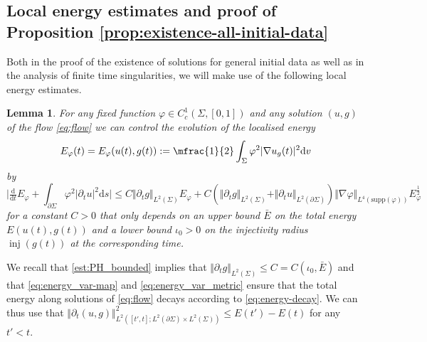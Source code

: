 \documentclass[10pt,reqno]{amsart}
\theoremstyle{plain}
\newtheorem{lemma}{Lemma}[section]
\theoremstyle{definition}
\numberwithin{equation}{section}
\newcommand{\Si}{\Sigma}
\newcommand{\vph}{\varphi}
\newcommand{\vphi}{\varphi}
\newcommand{\grad}{\nabla}
\DeclareMathOperator{\inj}{inj}
\newcommand{\norm}[1]{\Vert#1\Vert}
\newcommand{\beqs}{\begin{equation*}}
\newcommand{\eeqs}{\end{equation*}}
\newcommand{\half}{\frac{1}{2}}
\newcommand{\mhalf}{\mfrac{1}{2}}
\newcommand{\dd}{\mathrm{d}} %
\newcommand{\pt}{\partial_t}
\newcommand{\abs}[1]{\vert#1\vert}
\newcommand{\pSi}{{\partial \Sigma}}
\newcommand{\Ecut}{E_\varphi}
\newcommand{\supp}{\text{supp}}
\newcommand{\p}{\partial} %
\begin{document}
\subsection{Local energy estimates and proof of Proposition \ref{prop:existence-all-initial-data}}\label{subsec:loc-energy}
Both in the proof of the existence of solutions for general initial data as well as in the analysis of finite time singularities, we will make use of the following local energy estimates. 

\begin{lemma}\label{lemma:Ecut}
    For any fixed function $\vph\in C_c^1(\Si,[0,1])$ and any solution $(u,g)$ of the flow \eqref{eq:flow} we can control the evolution of  the localised energy
    \begin{equation*}       
        E_\vph(t)=E_\vphi(u(t),g(t)):=\mhalf\int_{\Si} \vph^2 \abs{\nabla u_g(t)}^2 \dd v
    \end{equation*}
    by 
	\beqs\label{est:loc_E_evol}
		\bigg| \tfrac{\dd}{\dd t} \Ecut+\int_{\pSi}\varphi^2 \abs{\p_t u}^2 \dd s \bigg| \leq C\norm{\pt g}_{L^2(\Si)}\Ecut + C(\norm{\pt g}_{L^2(\Si)}+\norm{\partial_t u}_{L^2(\pSi)}) \norm{\grad \vph}_{L^4(\supp(\vph))} \Ecut^\half
	\eeqs
	for a constant $C>0$ that only depends on an   upper bound $\bar{E}$ on the total energy $E(u(t),g(t))$ and a lower bound $\iota_0>0$ on the injectivity radius $\inj(g(t))$ at the corresponding time. 
\end{lemma}
We recall that \eqref{est:PH_bounded} implies that $\norm{\pt g}_{L^2(\Si)}\leq C=C(\iota_0,\bar E)$ and  that \eqref{eq:energy_var-map} and \eqref{eq:energy_var_metric} ensure that 
 the total energy along solutions of \eqref{eq:flow} decays according to \eqref{eq:energy-decay}. We can thus use that  $\norm{\pt(u,g)}_{L^2([t',t];L^2(\pSi)\times L^2(\Si))}^2\leq E(t')-E(t)$ for any $t'<t$.
\end{document}

